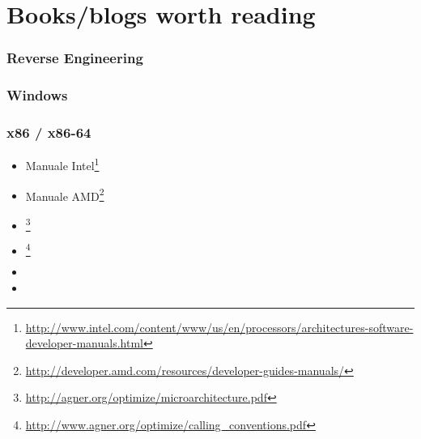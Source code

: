 \chapter{Books/blogs worth reading}


\subsection{Reverse Engineering}




\subsection{Windows}



\subsection{\CCpp}



\subsection{x86 / x86-64}

\label{x86_manuals}
\begin{itemize}
\item Manuale Intel\footnote{\AlsoAvailableAs \url{http://www.intel.com/content/www/us/en/processors/architectures-software-developer-manuals.html}}

\item Manuale AMD\footnote{\AlsoAvailableAs \url{http://developer.amd.com/resources/developer-guides-manuals/}}

\item \AgnerFog{}\footnote{\AlsoAvailableAs \url{http://agner.org/optimize/microarchitecture.pdf}}

\item \AgnerFogCC{}\footnote{\AlsoAvailableAs \url{http://www.agner.org/optimize/calling_conventions.pdf}}

\item \IntelOptimization

\item \AMDOptimization
\end{itemize}

